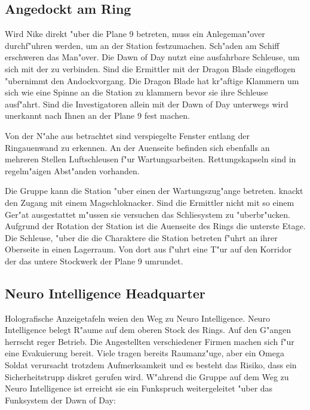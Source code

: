 \subsection{Angedockt am Ring}
Wird Nike direkt "uber die Plane 9 betreten, muss ein Anlegeman"over durchf"uhren werden, um an der Station festzumachen. Sch"aden am Schiff erschweren das Man"over. Die Dawn of Day nutzt eine ausfahrbare Schleuse, um sich mit der zu verbinden. Sind die Ermittler mit der Dragon Blade eingeflogen "ubernimmt \xl{} den Andockvorgang. Die Dragon Blade hat kr"aftige Klammern um sich wie eine Spinne an die Station zu klammern bevor sie ihre Schleuse ausf"ahrt. Sind die Investigatoren allein mit der Dawn of Day unterwegs wird \xl{} unerkannt nach Ihnen an der Plane 9 fest machen.

Von der N"ahe aus betrachtet sind verspiegelte Fenster entlang der Ringau\3enwand zu erkennen. An der Au\3enseite befinden sich ebenfalls an mehreren Stellen Luftschleusen f"ur Wartungsarbeiten. Rettungskapseln sind in regelm"a\3igen Abst"anden vorhanden.

Die Gruppe kann die Station "uber einen der Wartungszug"ange betreten. \xl{} knackt den Zugang mit einem Magschlo\3knacker. Sind die Ermittler nicht mit so einem Ger"at ausgestattet m"ussen sie versuchen das Schlie\3system zu "uberbr"ucken. Aufgrund der Rotation der Station ist die Au\3enseite des Rings die unterste Etage. Die Schleuse, "uber die die Charaktere die Station betreten f"uhrt an ihrer Oberseite in einen Lagerraum. Von dort aus f"uhrt eine T"ur auf den Korridor der das untere Stockwerk der Plane 9 umrundet. 

\subsection{Neuro Intelligence Headquarter}
Holografische Anzeigetafeln wei\3en den Weg zu Neuro Intelligence. Neuro Intelligence belegt R"aume auf dem oberen Stock des Rings. Auf den G"angen herrscht reger Betrieb. Die Angestellten verschiedener Firmen machen sich f"ur eine Evakuierung bereit. Viele tragen bereits Raumanz"uge, aber ein Omega Soldat verursacht trotzdem Aufmerksamkeit und es besteht das Risiko, dass ein Sicherheitstrupp diskret gerufen wird. W"ahrend die Gruppe auf dem Weg zu Neuro Intelligence ist erreicht sie ein Funkspruch weitergeleitet "uber das Funksystem der Dawn of Day:


